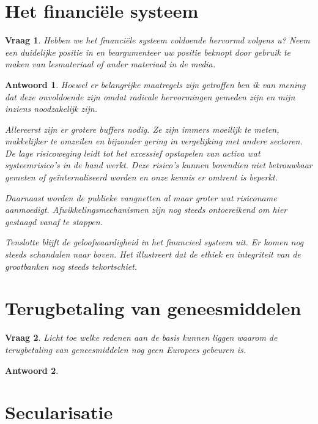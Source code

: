 \documentclass{article}
\theoremstyle{plain}
\newtheorem{question}{Vraag}
\theoremstyle{nonumberplain}
\newtheorem{answer}{Antwoord}
\begin{document}
\section{Het financiële systeem}

\begin{question}
Hebben we het financiële systeem voldoende hervormd volgens u? Neem een
duidelijke positie in en beargumenteer uw positie beknopt door gebruik te maken
van lesmateriaal of ander materiaal in de media.
\end{question}

\begin{answer}

Hoewel er belangrijke maatregels zijn getroffen ben ik van mening dat deze
onvoldoende zijn omdat radicale hervormingen gemeden zijn en mijn inziens
noodzakelijk zijn.

Allereerst zijn er grotere buffers nodig. Ze zijn immers moeilijk te meten,
makkelijker te omzeilen en bijzonder gering in vergelijking met andere sectoren.
De lage risicoweging leidt tot het excessief opstapelen van activa wat
systeemrisico's in de hand werkt. Deze risico's kunnen bovendien niet
betrouwbaar gemeten of geïnternaliseerd worden en onze kennis er omtrent is
beperkt.

Daarnaast worden de publieke vangnetten al maar groter wat risiconame
aanmoedigt. Afwikkelingsmechanismen zijn nog steeds ontoereikend om hier
gestaagd vanaf te stappen.

Tenslotte blijft de geloofwaardigheid in het financieel systeem uit. Er komen
nog steeds schandalen naar boven. Het illustreert dat de ethiek en integriteit
van de grootbanken nog steeds tekortschiet.

\end{answer}

\section{Terugbetaling van geneesmiddelen}

\begin{question}
Licht toe welke redenen aan de basis kunnen liggen waarom de terugbetaling van
geneesmiddelen nog geen Europees gebeuren is.
\end{question}

\begin{answer}

\end{answer}

\section{Secularisatie}
\end{document}
